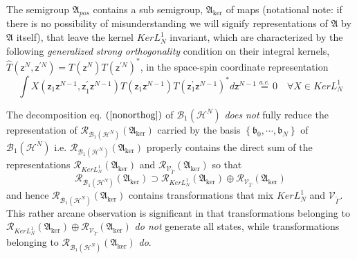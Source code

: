 \documentclass[aps,preprint]{revtex4}%
\begin{document}
The semigroup $\mathfrak{A}_{pos}$ contains a sub semigroup, $\mathfrak{A}%
_{\ker}$ of maps (notational note: if there is no possibility of
misunderstanding we will signify representations of $\mathfrak{A}$ by
$\mathfrak{A}$ itself), that leave the kernel $KerL_{N}^{1}$ invariant, which
are characterized by the following \textit{generalized} \textit{strong
orthogonality }condition on their integral kernels, $\hat{T}\left(
\mathsf{z}^{N},\mathsf{z}^{\prime N}\right)  =T\left(  \mathsf{z}^{N}\right)
T\left(  \mathsf{z}^{\prime N}\right)  ^{\ast}$, in the space-spin coordinate
representation
\begin{equation}
\int X\left(  \mathsf{z}_{1}\mathsf{z}^{N-1}\mathsf{,z}_{1}^{\prime}%
\mathsf{z}^{N-1}\right)  T\left(  \mathsf{z}_{1}\mathsf{z}^{N-1}\right)
T\left(  \mathsf{z}_{1}^{\prime}\mathsf{z}^{N-1}\right)  ^{\ast}%
d\mathsf{z}^{N-1}\overset{a.e.}{=}0\quad\forall X\in KerL_{N}^{1} \label{G}%
\end{equation}


The decomposition eq. $\left(  \ref{nonorthog}\right)  $ of $\mathcal{B}%
_{1}\left(  \mathcal{H}^{N}\right)  $ \emph{does} \emph{not }fully reduce the
representation of $\mathcal{R}_{\mathcal{B}_{1}\left(  \mathcal{H}^{N}\right)
}\left(  \mathfrak{A}_{\ker}\right)  $ carried by the basis $\left\{
\mathfrak{b}_{0},\cdots,\mathfrak{b}_{N}\right\}  $ of $\mathcal{B}_{1}\left(
\mathcal{H}^{N}\right)  $ \cite{weiner2002} i.e. $\mathcal{R}_{\mathcal{B}%
_{1}\left(  \mathcal{H}^{N}\right)  }\left(  \mathfrak{A}_{\ker}\right)  $
properly contains the direct sum of the representations $\mathcal{R}%
_{KerL_{N}^{1}}\left(  \mathfrak{A}_{\ker}\right)  $ and $\mathcal{R}%
_{\mathcal{V}_{\tilde{\Gamma}}}\left(  \mathfrak{A}_{\ker}\right)  $ so that%
\begin{equation}
\mathcal{R}_{\mathcal{B}_{1}\left(  \mathcal{H}^{N}\right)  }\left(
\mathfrak{A}_{\ker}\right)  \supset\mathcal{R}_{KerL_{N}^{1}}\left(
\mathfrak{A}_{\ker}\right)  \oplus\mathcal{R}_{\mathcal{V}_{\tilde{\Gamma}}%
}\left(  \mathfrak{A}_{\ker}\right)
\end{equation}
and hence $\mathcal{R}_{\mathcal{B}_{1}\left(  \mathcal{H}^{N}\right)
}\left(  \mathfrak{A}_{\ker}\right)  $ contains transformations that mix
$KerL_{N}^{1}$ and $\mathcal{V}_{\tilde{\Gamma}}$. This rather arcane
observation is significant in that transformations belonging to $\mathcal{R}%
_{KerL_{N}^{1}}\left(  \mathfrak{A}_{\ker}\right)  \oplus\mathcal{R}%
_{\mathcal{V}_{\tilde{\Gamma}}}\left(  \mathfrak{A}_{\ker}\right)  $ \emph{do
not }generate all states, while transformations belonging to $\mathcal{R}%
_{\mathcal{B}_{1}\left(  \mathcal{H}^{N}\right)  }\left(  \mathfrak{A}_{\ker
}\right)  $ \emph{do}.
\end{document}
